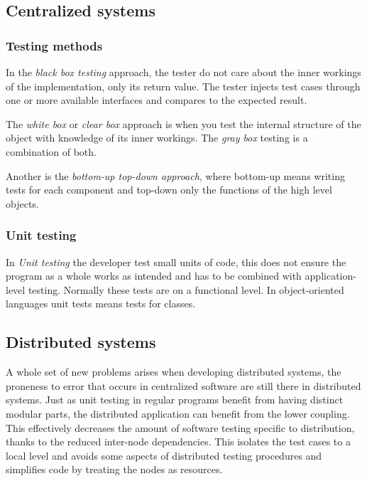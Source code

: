 \documentclass[10pt]{sensys-abstract}
\begin{document}
\subsection{Centralized systems} \noindent
\subsubsection{Testing methods}
In the \emph{black box testing} approach, the tester do not care about the inner workings of the implementation, only its return value. The tester injects test cases through one or more available interfaces and compares to the expected result.\cite{takanen2008fuzzing}

The \emph{white box} or \emph{clear box} approach is when you test the internal structure of the object with knowledge of its inner workings. The \emph{gray box} testing is a combination of both.

Another is the \emph{bottom-up top-down approach}, where bottom-up means writing tests for each component and top-down only the functions of the high level objects.

\subsubsection{Unit testing}
In \emph{Unit testing} the developer test small units of code, this does not ensure the program as a whole works as intended and has to be combined with application-level testing. Normally these tests are on a functional level. In object-oriented languages unit tests means tests for classes. 

\subsection{Distributed systems}\noindent
A whole set of new problems arises when developing distributed systems, the proneness to error that occurs in centralized software are still there in distributed systems. Just as unit testing in regular programs benefit from having distinct modular parts, the distributed application can benefit from the lower coupling. This effectively decreases the amount of software testing specific to distribution, thanks to the reduced inter-node dependencies. This isolates the test cases to a local level and avoids some aspects of distributed testing procedures and simplifies code by treating the nodes as resources.
\end{document}
